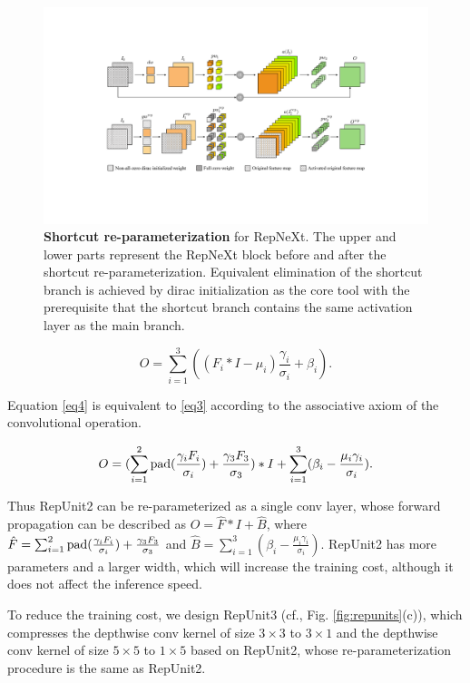 \documentclass[preprint,12pt]{elsarticle}
\begin{document}
\begin{figure}
  \centering
  \includegraphics[width=\textwidth]{figs/fig4.pdf}
  \caption{\textbf{Shortcut re-parameterization} for RepNeXt. The upper and lower parts represent the RepNeXt block before and after the shortcut re-parameterization. Equivalent elimination of the shortcut branch is achieved by dirac initialization as the core tool with the prerequisite that the shortcut branch contains the same activation layer as the main branch.}
  \label{fig:shortcutrep}
\end{figure}

\begin{equation}
   O=\sum_{i=1}^3 ((F_i * I-\mu_i) \frac{\gamma_i}{\sigma_i}+\beta_i).
    \label{eq3}
\end{equation}

Equation \eqref{eq4} is equivalent to \eqref{eq3} according to the associative axiom of the convolutional operation.

\begin{equation}
   O = (\sum_{i=1}^2{\rm pad}(\frac{\gamma_iF_i}{\sigma_i}) +\frac{\gamma_3F_3}{\sigma_3}) * I + \sum_{i=1}^3(\beta_i - \frac{\mu_i\gamma_i}{\sigma_i}).
    \label{eq4}
\end{equation}

Thus RepUnit2 can be re-parameterized as a single conv layer, whose forward propagation can be described as $O = \hat{F}*I + \hat{B}$, where $\hat{F}=\sum_{i=1}^2{\rm pad}(\frac{\gamma_iF_i}{\sigma_i}) +\frac{\gamma_3F_3}{\sigma_3}$ and $\hat{B} =\sum_{i=1}^3(\beta_i - \frac{\mu_i\gamma_i}{\sigma_i})$. RepUnit2 has more parameters and a larger width, which will increase the training cost, although it does not affect the inference speed.

To reduce the training cost, we design RepUnit3 (cf., Fig. \ref{fig:repunits}(c)), which compresses the depthwise conv kernel of size $3 \times 3$ to $3 \times 1$ and the depthwise conv kernel of size $5 \times 5$ to $1 \times 5$ based on RepUnit2, whose re-parameterization procedure is the same as RepUnit2.
\end{document}
